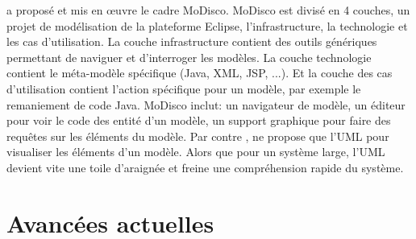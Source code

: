 \documentclass[a4paper]{article}
\begin{document}
\citet{Brun14c} a proposé et mis en œuvre le cadre MoDisco.
MoDisco est divisé en 4 couches, un projet de modélisation de la plateforme Eclipse, l'infrastructure, la technologie et les cas d'utilisation.
La couche infrastructure contient des outils génériques permettant de naviguer et d'interroger les modèles.
La couche technologie contient le méta-modèle spécifique (Java, XML, JSP, ...).
Et la couche des cas d'utilisation contient l'action spécifique pour un modèle, par exemple le remaniement de code Java.
MoDisco inclut: un navigateur de modèle, un éditeur pour voir le code des entité d'un modèle, un support graphique pour faire des requêtes sur les éléments du modèle. 
Par contre \citet{Brun14c}, ne propose que l'UML pour visualiser les éléments d'un modèle.
Alors que pour un système large, l'UML devient vite une toile d'araignée et freine une compréhension rapide du système.

\section{Avancées actuelles}
\end{document}
